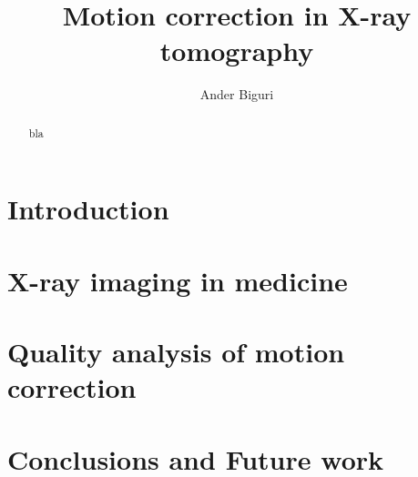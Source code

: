\documentclass[11pt]{report}
\title{Motion correction in X-ray tomography}
\author{Ander Biguri}
\begin{document}
\maketitle

\begin{abstract}
bla
\end{abstract}


\tableofcontents

\chapter{Introduction}\label{ch:intro}
\chapter{X-ray imaging in medicine}\label{ch:soa}
\label{ch:rec}


\label{ch:apllications}

\chapter{Quality analysis of motion correction}\label{ch:motion analisis}
\chapter{Conclusions and Future work}\label{ch:conclusions}



\end{document}

